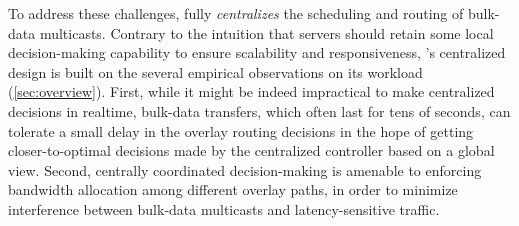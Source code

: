 %

To address these challenges, \name fully {\em centralizes}
the scheduling and routing of bulk-data multicasts.
Contrary to the intuition that servers should retain some
local decision-making capability to ensure scalability and
responsiveness, \name's centralized design
is built on the several empirical observations on its workload
(\Section\ref{sec:overview}).
First, while it might be indeed impractical to make
centralized decisions in realtime, bulk-data transfers, which
often last for tens of seconds,
can tolerate a small delay in the overlay routing decisions
in the hope of getting closer-to-optimal decisions made by
the centralized controller based on a global view.
Second, centrally coordinated decision-making is amenable
to enforcing bandwidth allocation among different overlay paths,
in order to minimize interference between bulk-data
multicasts and latency-sensitive traffic.

